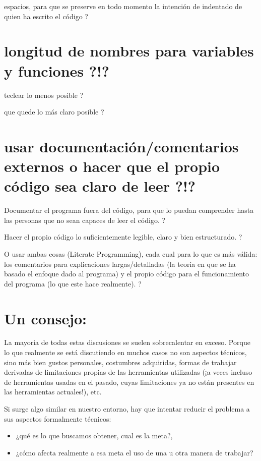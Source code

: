 \documentclass[spanish,12pt,a4paper,final,oneside]{book}
\begin{document}
espacios, para que se preserve en todo momento la intención de indentado de quien ha escrito el código ? 

\section{longitud de nombres para variables y funciones ?!?}
teclear lo menos posible ?

que quede lo más claro posible ?

\section{usar documentación/comentarios externos o hacer que el propio código sea claro de leer ?!?}
Documentar el programa fuera del código, para que lo puedan comprender hasta las personas que no sean capaces de leer el código. ?

Hacer el propio código lo suficientemente legible, claro y bien estructurado. ?

O usar ambas cosas (Literate Programming), cada cual para lo que es más válida: los comentarios para explicaciones largas/detalladas (la teoria en que se ha basado el enfoque dado al programa) y el propio código para el funcionamiento del programa (lo que este hace realmente). ?

\section{Un consejo:}
La mayoria de todas estas discusiones se suelen sobrecalentar en exceso. Porque lo que realmente se está discutiendo en muchos casos no son aspectos técnicos, sino más bien gustos personales, costumbres adquiridas, formas de trabajar derivadas de limitaciones propias de las herramientas utilizadas (¡a veces incluso de herramientas usadas en el pasado, cuyas limitaciones ya no están presentes en las herramientas actuales!), etc.

Si surge algo similar en nuestro entorno, hay que intentar reducir el problema a sus aspectos formalmente técnicos:
\begin{itemize}
\item ¿qué es lo que buscamos obtener, cual es la meta?, 
\item ¿cómo afecta realmente a esa meta el uso de una u otra manera de trabajar?
\end{itemize}
\end{document}
